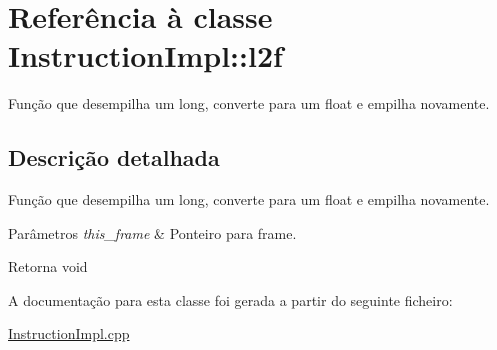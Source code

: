 \hypertarget{class_instruction_impl_1_1l2f}{}\section{Referência à classe Instruction\+Impl\+:\+:l2f}
\label{class_instruction_impl_1_1l2f}


Função que desempilha um long, converte para um float e empilha novamente.  




\subsection{Descrição detalhada}
Função que desempilha um long, converte para um float e empilha novamente. 


\begin{DoxyParams}{Parâmetros}
{\em this\+\_\+frame} & Ponteiro para frame. \\
\hline
\end{DoxyParams}
\begin{DoxyReturn}{Retorna}
void 
\end{DoxyReturn}


A documentação para esta classe foi gerada a partir do seguinte ficheiro\+:\begin{DoxyCompactItemize}
\item 
\hyperlink{_instruction_impl_8cpp}{Instruction\+Impl.\+cpp}\end{DoxyCompactItemize}

